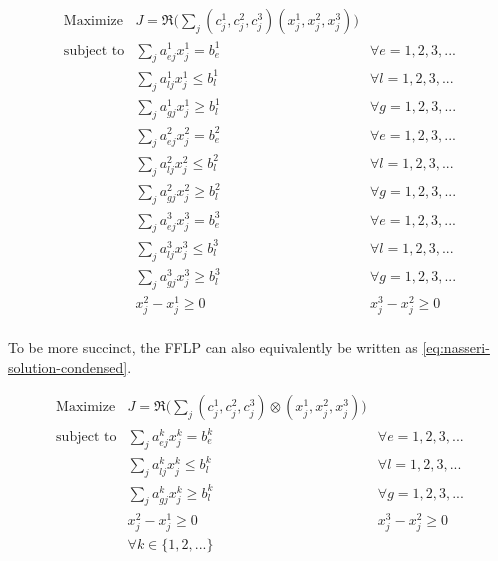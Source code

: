 \documentclass[11pt,a4paper,final]{article}
\begin{document}
\begin{equation}
\label{eq:nasseri-solution}
\begin{array}{lll}
\text{Maximize}   & J = \mathfrak{R}\Big(\sum_j (c_j^1,c_j^2,c_j^3)(x_j^1,x_j^2,x_j^3)\Big) &\\
\text{subject to} & \sum_j a_{ej}^1 x_j^1 = b_e^1 &  \forall e = 1,2,3,... \\
                  & \sum_j a_{lj}^1 x_j^1 \le b_l^1 &  \forall l = 1,2,3,... \\
                  & \sum_j a_{gj}^1 x_j^1 \ge b_l^1  &  \forall g = 1,2,3,... \\
                  & \sum_j a_{ej}^2 x_j^2 = b_e^2 &  \forall e = 1,2,3,... \\
                  & \sum_j a_{lj}^2 x_j^2 \le b_l^2 &  \forall l = 1,2,3,... \\
                  & \sum_j a_{gj}^2 x_j^2 \ge b_l^2  &  \forall g = 1,2,3,... \\
                  & \sum_j a_{ej}^3 x_j^3 = b_e^3 &  \forall e = 1,2,3,... \\
                  & \sum_j a_{lj}^3 x_j^3 \le b_l^3 &  \forall l = 1,2,3,... \\
                  & \sum_j a_{gj}^3 x_j^3 \ge b_l^3  &  \forall g = 1,2,3,... \\
                  & x_j^2 - x_j^1 \ge 0         & x_j^3 - x_j^2 \ge 0 \\
\end{array}
\end{equation}

\noindent
To be more succinct, the FFLP can also equivalently be written as \autoref{eq:nasseri-solution-condensed}.

\begin{equation}
\label{eq:nasseri-solution-condensed}
\begin{array}{lll}
\text{Maximize}   & J = \mathfrak{R}\Big(\sum_j (c_j^1,c_j^2,c_j^3) \otimes (x_j^1,x_j^2,x_j^3)\Big) &\\
\text{subject to} & \sum_j a_{ej}^k x_j^k = b_e^k &  \forall e = 1,2,3,... \\
                  & \sum_j a_{lj}^k x_j^k \le b_l^k &  \forall l = 1,2,3,... \\
                  & \sum_j a_{gj}^k x_j^k \ge b_l^k  &  \forall g = 1,2,3,... \\
                  & x_j^2 - x_j^1 \ge 0         & x_j^3 - x_j^2 \ge 0 \\
                  & \forall k \in \{1,2,...\}        &                  \\
\end{array}
\end{equation}
\end{document}
